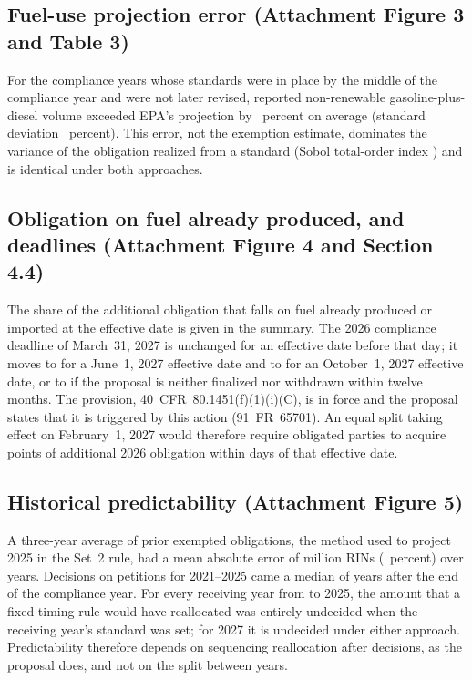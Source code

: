 \documentclass[11pt]{article}
\newcommand{\AttFigDistributions}{3}
\newcommand{\AttFigTradeoff}{4}
\newcommand{\AttFigBacktest}{5}
\newcommand{\AttTabUncertainty}{3}
\newcommand{\AttSecDeadlines}{4.4}
\begin{document}
\subsection{Fuel-use projection error (Attachment Figure \AttFigDistributions{} and Table \AttTabUncertainty)}
For the \valnFuelErrorsProspective{} compliance years whose standards were in place by the middle of the compliance year and were not later revised, reported non-renewable gasoline-plus-diesel volume exceeded EPA's projection by \valfuelErrorMeanPct{}~percent on average (standard deviation \valfuelErrorSdPct{}~percent). This error, not the exemption estimate, dominates the variance of the obligation realized from a standard (Sobol total-order index \valsobolFuelRealizedSecondEqual{}) and is identical under both approaches.

\subsection{Obligation on fuel already produced, and deadlines (Attachment Figure \AttFigTradeoff{} and Section \AttSecDeadlines)}
The share of the additional obligation that falls on fuel already produced or imported at the effective date is given in the summary. The 2026 compliance deadline of March~31, 2027 is unchanged for an effective date before that day; it moves to \valdeadlineScenarioHypotheticalMidTwoZeroTwoSeven{} for a June~1, 2027 effective date and to \valdeadlineScenarioHypotheticalLateTwoZeroTwoSeven{} for an October~1, 2027 effective date, or to \valdeadlineNotFinalized{} if the proposal is neither finalized nor withdrawn within twelve months. The provision, 40~CFR~80.1451(f)(1)(i)(C), is in force and the proposal states that it is triggered by this action (91~FR~65701). An equal split taking effect on February~1, 2027 would therefore require obligated parties to acquire \valstepFirstEqual{} points of additional 2026 obligation within \valdeadlineDaysScenarioHypotheticalEarlyTwoZeroTwoSeven{} days of that effective date.

\subsection{Historical predictability (Attachment Figure \AttFigBacktest)}
A three-year average of prior exempted obligations, the method used to project 2025 in the Set~2 rule, had a mean absolute error of \valprojMaeHindsight{} million RINs (\valprojMaeHindsightPct{}~percent) over \valnProjYears{} years. Decisions on petitions for 2021--2025 came a median of \vallagMedianYears{} years after the end of the compliance year. For every receiving year from \valbtFirstTargetYear{} to 2025, the amount that a fixed timing rule would have reallocated was entirely undecided when the receiving year's standard was set; for 2027 it is undecided under either approach. Predictability therefore depends on sequencing reallocation after decisions, as the proposal does, and not on the split between years.
\end{document}
